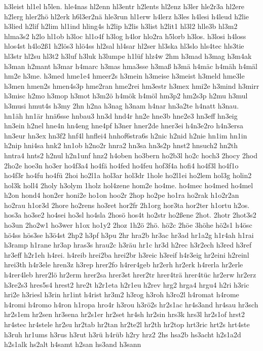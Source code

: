 {h3leist
hl1el
h5len.
hle4nas
hl2enn
hl3entr
h2lents
hl2enz
h3ler
hle2r3a
hl2ere
h2lerg
hler2hö
hl2erk
h6l3er2nä
hle3run
hl1erw
h4lerz
h3les
h4lesi
h4leud
h2lie
h3lied
h2lif
h2lim
hl1ind
hling4s
h2lip
h2lis
h3list
h2lit1
hl3l2
hlle3b
hl3m2
hlma3s2
h2lo
hl1ob
h3loc
hl1o4f
h3log
h4lor
hlo2ra
h5lorb
h3los.
h3losi
h4loss
hlos4st
h4lo2ß1
h2lös3
hlö4ss
hl2sal
hl4sar
hl2ser
hl3ska
hl3slo
hls4tec
hls3tie
hl3str
hl2su
hl3t2
h3luf
h3luk
h3lumpe
h1lüf
hlz4w
2hm
h3mad
h3mag
h3m4ak
h3man
h2mant
h3mar
h4marc
h3mas
hma3sse
h3maß
h3mä
h4mäc
h4mäh
h4mäl
hm2e
h3me.
h3med
hme1e4
hmeer2s
h3mein
h3meise
h3meist
h3meld
hme3le
h3men
hmen2s
hmen4s3p
hme2ran
hme2rei
hm3estr
h3mex
hmi2e
h3mind
h3mirr
h3misc
h2mo
h3mop
h3mot
h3m2ö
h4mök
h4möl
hm3p2
hm2s3p
h2mu
h3mul
h3musi
hmut4s
h3my
2hn
h2na
h3nag
h3nam
h4nar
hn3a2te
h4natt
h3nau.
hn1äh
hn1är
hnä6sse
hnbau3
hn3d
hnd4r
hn2e
hne3b
hne2e3
hn3eff
hn3eig
hn3ein
h2nel
hne4n
hn4eng
hne4pf
h3ner
hner2de
hner3ei
h4n3e2ro
h4n3ersa
hn3eur
hn3ex
hn3f2
hnf4l
hnflei4
hnhof6stra6s
h2nic
h2nid
h2nie
hn1im
hn1in
h2nip
hni4sa
hnk2
hn1ob
h2no2r
hnra2
hn3sa
hn3s2p
hnst2
hnsuch2
hn2th
hntra4
hnts2
h2nul
h2n1unf
hnz2
h4oben
ho3bern
ho2b3l
ho2c
hoch3
2hocy
2hod
2ho2e
hoe3n
ho3er
ho4f3a4
ho4fä
ho4fed
ho4feu
hof3f4a
hofi4
ho4f3l
ho4f1o
ho4f3r
ho4fu
ho4fü
2hoi
ho2l1a
hol3ar
hol3dr
1hole
ho2l1ei
ho2lem
hol3g
holin2
hol3k
holl4
2holy
h3olym
1holz
hol4zene
hom2e
ho4me.
ho4mec
ho4med
ho4mel
h2on
hond4
hon2er
honi2e
ho1on
hoo2r
2hop
ho2pe
ho1ra
ho2rak
h1o2r2an
ho2rau
h1or3d
2hore
ho2rens
ho3ret
hor2fr
2h1org
hor3ta
hor2ter
h1ortu
h2os.
hos3a
ho3se2
ho4sei
ho3sl
ho4sla
2hosö
hos4t
ho2str
ho2ßene
2hot.
2hotr
2hot3s2
ho3un
2ho2w1
ho3wer
h1ox
ho1y2
2hoz
1h2ö
2hö.
hö2c
2höe
3höhe
hö2s1
h4ösc
hö4ss
hös3se
h3ö4st
2hp2
h3pf
h3pu
2hr
hra2b
hr3ac
hr3ad
hr1a2g
h1r4ah
h1rai
h3ramp
h1rane
hr3ap
hras3s
hrau2c
h3räu
hr1c
hr3d
h2rec
h3r2ech
h3red
h3ref
hr3eff
h2r1eh
h4rei.
h4reib
hrei2ba
hrei2br
h3reic
h3reif
h4r3eig
hr2eini
h2reinl
hrei3th
h4r3ele
hren3z
h3rep
hrer2fo
h4rer4geb
hr2erh
hr2erk
h4rerla
hr2erle
h4rer4leb
hrer2lö
hr2erm
hrer2sa
hrer3st
hrer2tr
hrer4trä
hrer4tüc
hr2erw
hr2erz
h3re2s3
hres5s4
hrest2
hre2t
h2r1eta
h2r1eu
h2rev
hrg2
hrga4
hrgu4
h2ri
h3ric
hri2e
h3riesl
h3rin
hr1int
h4rist
hr3m2
h3rog
h3roh
h3ro2l
h4romat
h4rome
h4romi
h4romo
h4ron
h1ropa
hro4r
h3rou
h3rö2s
hr2s1ac
hr4s3and
hr4sau
hr3sch
hr2s1em
hr2sen
hr3sena
hr2s1er
hr2set
hr4sh
hr2sin
hrs3k
hrs3l
hr2s1of
hrst2
hr4stec
hr4stele
hr2su
hr2tab
hr2tan
hr2te2l
hr2th
hr2top
hrt3ric
hrt2s
hrt4ste
h3ruh
hr1ums
h3rus
h3rut
h3rü
h4rüb
h2ry
hrz2
2hs
hsa2b
hs3acht
h2s1a2d
h2s1alk
hs2alt
h4samt
h2san
hs3and
h3sann
}
